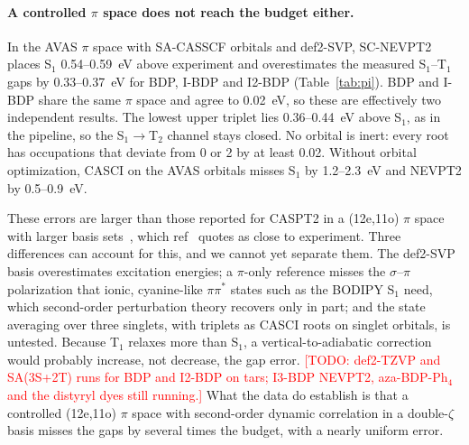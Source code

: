 \documentclass[journal=jctcce,manuscript=article,layout=twocolumn]{achemso}
\newcommand{\todo}[1]{\textcolor{red}{[TODO: #1]}}
\begin{document}
\paragraph{A controlled $\pi$ space does not reach the budget either.} In the AVAS $\pi$ space with
SA-CASSCF orbitals and def2-SVP, SC-NEVPT2 places S$_1$ 0.54--0.59~eV above experiment and overestimates the
measured S$_1$--T$_1$ gaps by 0.33--0.37~eV for BDP, I-BDP and I2-BDP (Table~\ref{tab:pi}). BDP and I-BDP share
the same $\pi$ space and agree to 0.02~eV, so these are effectively two independent results. The lowest upper
triplet lies 0.36--0.44~eV above S$_1$, as in the pipeline, so the S$_1\to$T$_2$ channel stays closed. No
orbital is inert: every root has occupations that deviate from 0 or 2 by at least 0.02. Without orbital
optimization, CASCI on the AVAS orbitals misses S$_1$ by 1.2--2.3~eV and NEVPT2 by 0.5--0.9~eV.

These errors are larger than those reported for CASPT2 in a (12e,11o) $\pi$ space with larger basis
sets~\cite{Momeni2015}, which ref~ quotes as close to experiment. Three differences can
account for this, and we cannot yet separate them. The def2-SVP basis overestimates excitation energies; a
$\pi$-only reference misses the $\sigma$--$\pi$ polarization that ionic, cyanine-like $\pi\pi^*$ states such as
the BODIPY S$_1$ need, which second-order perturbation theory recovers only in part; and the state averaging
over three singlets, with triplets as CASCI roots on singlet orbitals, is untested. Because T$_1$ relaxes more
than S$_1$, a vertical-to-adiabatic correction would probably increase, not decrease, the gap error.
\todo{def2-TZVP and SA(3S+2T) runs for BDP and I2-BDP on tars; I3-BDP NEVPT2, aza-BDP-Ph$_4$ and the distyryl
dyes still running.} What the data do establish is that a controlled (12e,11o) $\pi$ space with
second-order dynamic correlation in a double-$\zeta$ basis misses the gaps by several times the budget, with a
nearly uniform error.
\end{document}
